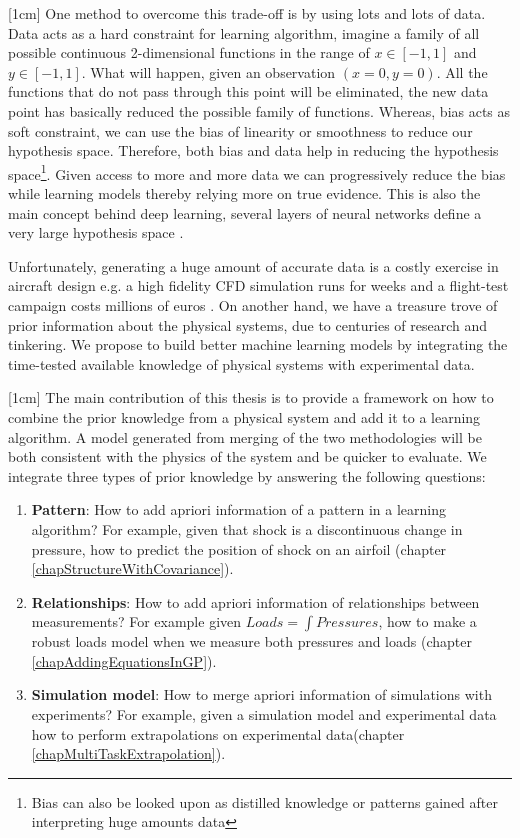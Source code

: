 [1cm]
One method to overcome this trade-off is by using lots and lots of data. Data acts as a hard constraint for learning algorithm, imagine a family of all possible continuous 2-dimensional functions in the range of $x \in [-1, 1]$ and $y \in [-1, 1]$. What will happen, given an observation $(x = 0, y = 0)$. All the functions that do not pass through this point will be eliminated, the new data point has basically reduced the possible family of functions. Whereas, bias acts as soft constraint, we can use the bias of linearity or smoothness to reduce our hypothesis space. Therefore, both bias and data help in reducing the hypothesis space\footnote{Bias can also be looked upon as distilled knowledge or patterns gained after interpreting huge amounts data}. Given access to more and more data we can progressively reduce the bias while learning models thereby relying more on true evidence. This is also the main concept behind deep learning, several layers of neural networks define a very large hypothesis space \cite{Goodfellow-et-al-2016, lecun2015deep}. 

Unfortunately, generating a huge amount of accurate data is a costly exercise in aircraft design e.g. a high fidelity CFD simulation runs for weeks \cite{murthy2014computational, jameson2012computational} and a flight-test campaign costs millions of euros \cite{fox2004test}. On another hand, we have a treasure trove of prior information about the physical systems, due to centuries of research and tinkering. We propose to build better machine learning models by integrating the time-tested available knowledge of physical systems with experimental data. 

[1cm]
The main contribution of this thesis is to provide a framework on how to combine the prior knowledge from a physical system and add it to a learning algorithm. A model generated from merging of the two methodologies will be both consistent with the physics of the system and be quicker to evaluate. We integrate three types of prior knowledge by answering the following questions:
\begin{enumerate}
\item \textbf{Pattern}: How to add apriori information of a pattern in a learning algorithm? For example, given that shock is a discontinuous change in pressure, how to predict the position of shock on an airfoil (chapter \ref{chapStructureWithCovariance}). 
\item \textbf{Relationships}: How to add apriori information of relationships between measurements? For example given \(Loads = \int Pressures\), how to make a robust loads model when we measure both pressures and loads (chapter \ref{chapAddingEquationsInGP}).
\item \textbf{Simulation model}: How to merge apriori information of simulations with experiments? For example, given a simulation model and experimental data how to perform extrapolations on experimental data(chapter \ref{chapMultiTaskExtrapolation}). 
\end{enumerate}

